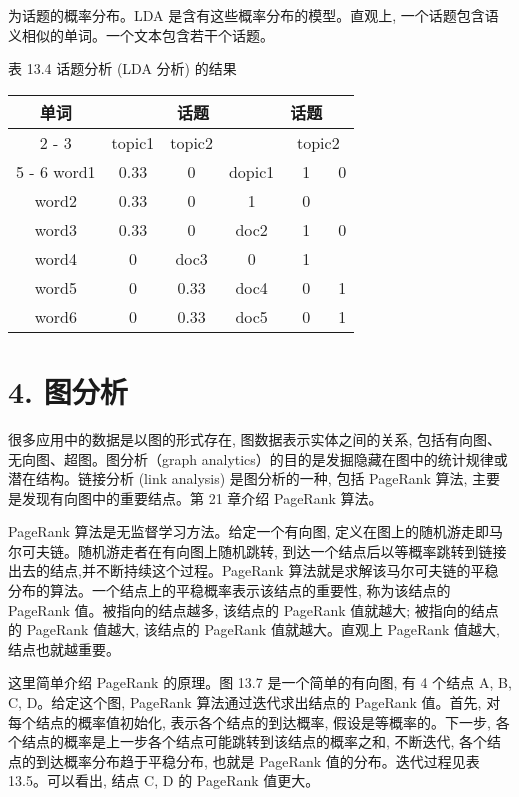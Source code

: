 \documentclass[10pt]{article}
\begin{document}
\begin{CJK*}{UTF8}{bsmi}
为话题的概率分布。LDA 是含有这些概率分布的模型。直观上, 一个话题包含语义相似的单词。一个文本包含若干个话题。

表 13.4 话题分析 (LDA 分析) 的结果

\begin{center}
\begin{tabular}{c|cc||c|cc}
\hline
\multirow{2}{*}{单词} & \multicolumn{3}{|c|}{话题} & \multirow{2}{*}{话题} &  \\
\cline { 2 - 3 }
 & topic1 & topic2 &  & \multicolumn{2}{|c}{topic2} \\
\cline { 5 - 6 }
word1 & 0.33 & 0 & dopic1 & 1 & 0 \\
word2 & 0.33 & 0 & 1 & 0 &  \\
word3 & 0.33 & 0 & doc2 & 1 & 0 \\
word4 & 0 & doc3 & 0 & 1 &  \\
word5 & 0 & 0.33 & doc4 & 0 & 1 \\
word6 & 0 & 0.33 & doc5 & 0 & 1 \\
\hline
\end{tabular}
\end{center}

\section*{4. 图分析}
很多应用中的数据是以图的形式存在, 图数据表示实体之间的关系, 包括有向图、无向图、超图。图分析（graph analytics）的目的是发掘隐藏在图中的统计规律或潜在结构。链接分析 (link analysis) 是图分析的一种, 包括 PageRank 算法, 主要是发现有向图中的重要结点。第 21 章介绍 PageRank 算法。

PageRank 算法是无监督学习方法。给定一个有向图, 定义在图上的随机游走即马尔可夫链。随机游走者在有向图上随机跳转, 到达一个结点后以等概率跳转到链接出去的结点,并不断持续这个过程。PageRank 算法就是求解该马尔可夫链的平稳分布的算法。一个结点上的平稳概率表示该结点的重要性, 称为该结点的 PageRank 值。被指向的结点越多, 该结点的 PageRank 值就越大; 被指向的结点的 PageRank 值越大, 该结点的 PageRank 值就越大。直观上 PageRank 值越大, 结点也就越重要。

这里简单介绍 PageRank 的原理。图 13.7 是一个简单的有向图, 有 4 个结点 A, B, C, D。给定这个图, PageRank 算法通过迭代求出结点的 PageRank 值。首先, 对每个结点的概率值初始化, 表示各个结点的到达概率, 假设是等概率的。下一步, 各个结点的概率是上一步各个结点可能跳转到该结点的概率之和, 不断迭代, 各个结点的到达概率分布趋于平稳分布, 也就是 PageRank 值的分布。迭代过程见表 13.5。可以看出, 结点 C, D 的 PageRank 值更大。


\end{CJK*}
\end{document}
